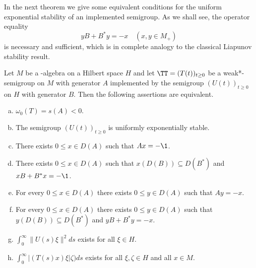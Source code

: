 In the next theorem we give some equivalent conditions for the uniform exponential stability of an implemented semigroup.
As we shall see, the operator equality
\[
yB + B^{*}y = -x \quad (x, y \in M_{+})
\]
is necessary and sufficient, which is in complete analogy to the classical Liapunov stability result.

\begin{theorem}\label{thm:d4-2.2}
Let $M$ be a \WA-algebra on a Hilbert space $H$ and let $\TT = (T(t))_{t \geq 0}$ be a weak*-semigroup on $M$ with generator $A$ implemented by the semigroup $(U(t))_{t \geq 0}$ on $H$ with generator $B$.
Then the following assertions are equivalent.

\begin{enumerate}[(a)]
\item
$\omega_{0}(T) = s(A) < 0$.

\item
The semigroup $(U(t))_{t \geq 0}$ is uniformly exponentially stable.

\item
There exists $0 \leq x \in D(A)$ such that $Ax = -\1$.

\item
There exists $0 \leq x \in D(A)$ such that $x(D(B)) \subseteq D(B^{*})$ \mbox{and $xB+B^{*}x = -\1$}.

\item
For every $0 \leq x \in D(A)$ there exists $0 \leq y \in D(A)$ such that $Ay = -x$.

\item
For every $0 \leq x \in D(A)$ there exists $0 \leq y \in D(A)$ such that $y(D(B)) \subseteq D(B^{*})$ and $yB+B^{*}y = -x$.

\item
$\int_{0}^{\infty} \|U(s)\xi\|^2ds$ exists for all $\xi \in H$.

\item
$\int_{0}^{\infty} |(T(s)x)\xi|\zeta)ds$ exists for all $\xi,\zeta \in H$ and all $x \in M$.
\end{enumerate}
\end{theorem}

